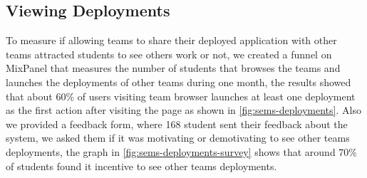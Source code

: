 \subsection{Viewing Deployments}
\label{sub:deployments-views}
To measure if allowing teams to share their deployed application with other teams attracted students to see others work or not, we created
a funnel on MixPanel\texttrademark{} that measures the number of students that browses the teams and launches the deployments of other teams during
one month, the results showed that about 60\% of users visiting team browser launches at least one deployment as the first action after visiting the
page as shown in \ref{fig:sems-deployments}. Also we provided a feedback form, where 168 student sent their feedback about the system, we
asked them if it was motivating or demotivating to see other teams deployments, the graph in \ref{fig:sems-deployments-survey} shows that around 70\%
of students found it incentive to see other teams deployments.
